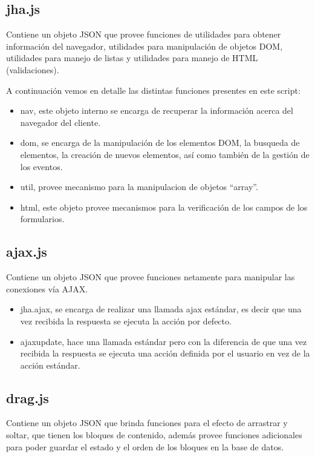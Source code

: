 \subsection{jha.js}
Contiene un objeto JSON que provee funciones de utilidades para obtener informaci\'on del navegador, utilidades para manipulaci\'on de objetos DOM, utilidades para manejo de listas y utilidades para manejo de HTML (validaciones).



A continuaci\'on vemos en detalle las distintas funciones presentes en este script:
\begin{itemize}
\item \textsf{nav}, este objeto interno se encarga de recuperar la informaci\'on acerca del navegador del cliente.
\item \textsf{dom}, se encarga de la manipulaci\'on de los elementos DOM, la busqueda de elementos, la creaci\'on de nuevos elementos, as\'i como tambi\'en de la gesti\'on de los eventos.
\item \textsf{util}, provee mecanismo para la manipulacion de objetos ``array''.
\item \textsf{html}, este objeto provee mecanismos para la verificaci\'on de los campos de los formularios.
\end{itemize}

\subsection{ajax.js}
Contiene un objeto JSON que provee funciones netamente para manipular las conexiones v\'ia AJAX.



\begin{itemize}
\item \textsf{jha.ajax}, se encarga de realizar una llamada ajax est\'andar, es decir que una vez recibida la respuesta se ejecuta la acci\'on por defecto.
\item \textsf{ajaxupdate}, hace una llamada est\'andar pero con la diferencia de que una vez recibida la respuesta se ejecuta una acci\'on definida por el usuario en vez de la acci\'on est\'andar.
\end{itemize}

\subsection{drag.js}
Contiene un objeto JSON que brinda funciones para el efecto de arrastrar y soltar, que tienen los bloques de contenido, adem\'as provee funciones adicionales para poder guardar el estado y el orden de los bloques en la base de datos.

